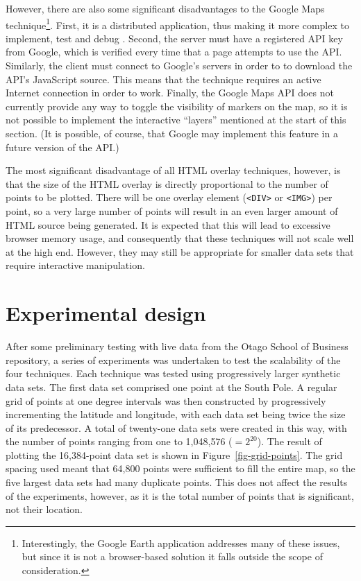 \documentclass[acmnow]{acmtrans2m}
\begin{document}
However, there are also some significant disadvantages to the Google
Maps technique\footnote{Interestingly, the Google Earth application
addresses many of these issues, but since it is not a browser-based
solution it falls outside the scope of consideration.}. First, it is
a distributed application, thus making it more complex to implement,
test and debug \cite{Bates-PC-1995-distdebug,Ensl-PH-1978-distributed}.
Second, the server must have a registered API key from Google, which is
verified every time that a page attempts to use the API. Similarly, the
client must connect to Google's servers in order to to download the
API's JavaScript source. This means that the technique requires an
active Internet connection in order to work. Finally, the Google Maps
API does not currently provide any way to toggle the visibility of
markers on the map, so it is not possible to implement the interactive
``layers'' mentioned at the start of this section. (It is possible, of
course, that Google may implement this feature in a future version of
the API.)

The most significant disadvantage of all HTML overlay techniques,
however, is that the size of the HTML overlay is directly proportional
to the number of points to be plotted. There will be one overlay element
(\verb|<DIV>| or \verb|<IMG>|) per point, so a very large number of
points will result in an even larger amount of HTML source being
generated. It is expected that this will lead to excessive browser
memory usage, and consequently that these techniques will not scale well
at the high end. However, they may still be appropriate for smaller data
sets that require interactive manipulation.


\section{Experimental design}
\label{sec-experiment}

After some preliminary testing with live data from the Otago School of
Business repository, a series of experiments was undertaken to test the
scalability of the four techniques. Each technique was tested using
progressively larger synthetic data sets. The first data set comprised
one point at the South Pole. A regular grid of points at one degree
intervals was then constructed by progressively incrementing the
latitude and longitude, with each data set being twice the size of its
predecessor. A total of twenty-one data sets were created in this way,
with the number of points ranging from one to 1,048,576 (\(=2^{20}\)).
The result of plotting the 16,384-point data set is shown in
Figure~\ref{fig-grid-points}. The grid spacing used meant that 64,800
points were sufficient to fill the entire map, so the five largest data
sets had many duplicate points. This does not affect the results of the
experiments, however, as it is the total number of points that is
significant, not their location.
\end{document}
